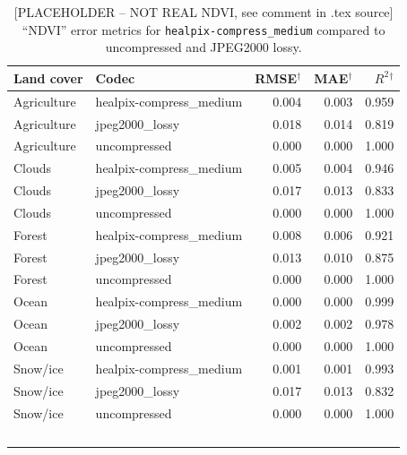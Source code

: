 \begin{table}[t]
\centering
\caption{[PLACEHOLDER -- NOT REAL NDVI, see comment in .tex source] ``NDVI'' error metrics for \texttt{healpix-compress\_medium} compared to uncompressed and JPEG2000 lossy.}
\label{tab:ndvi_metrics_stub}
\begin{tabular}{@{}llrrr@{}}
\toprule
Land cover & Codec & RMSE$^\dagger$ & MAE$^\dagger$ & $R^2$$^\dagger$ \\
\midrule
Agriculture & healpix-compress\_medium & 0.004 & 0.003 & 0.959 \\
Agriculture & jpeg2000\_lossy          & 0.018 & 0.014 & 0.819 \\
Agriculture & uncompressed             & 0.000 & 0.000 & 1.000 \\
Clouds      & healpix-compress\_medium & 0.005 & 0.004 & 0.946 \\
Clouds      & jpeg2000\_lossy          & 0.017 & 0.013 & 0.833 \\
Clouds      & uncompressed             & 0.000 & 0.000 & 1.000 \\
Forest      & healpix-compress\_medium & 0.008 & 0.006 & 0.921 \\
Forest      & jpeg2000\_lossy          & 0.013 & 0.010 & 0.875 \\
Forest      & uncompressed             & 0.000 & 0.000 & 1.000 \\
Ocean       & healpix-compress\_medium & 0.000 & 0.000 & 0.999 \\
Ocean       & jpeg2000\_lossy          & 0.002 & 0.002 & 0.978 \\
Ocean       & uncompressed             & 0.000 & 0.000 & 1.000 \\
Snow/ice    & healpix-compress\_medium & 0.001 & 0.001 & 0.993 \\
Snow/ice    & jpeg2000\_lossy          & 0.017 & 0.013 & 0.832 \\
Snow/ice    & uncompressed             & 0.000 & 0.000 & 1.000 \\
$$
\end{tabular}
\end{table}
